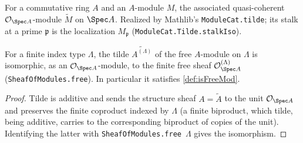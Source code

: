 \begin{definition}
  \label{def:tildeMod}
  \mathlibok
  For a commutative ring $A$ and an $A$-module $M$, the associated
  quasi-coherent $\mathcal{O}_{\Spec A}$-module $\widetilde M$ on $\Spec A$.
  Realized by Mathlib's \texttt{ModuleCat.tilde}; its stalk at a prime
  $\mathfrak p$ is the localization $M_{\mathfrak p}$
  (\texttt{ModuleCat.Tilde.stalkIso}).
\end{definition}

\begin{lemma}
  \label{lem:tilde_free}
  For a finite index type $\Lambda$, the tilde $\widetilde{A^{(\Lambda)}}$ of the
  free $A$-module on $\Lambda$ is isomorphic, as an
  $\mathcal{O}_{\Spec A}$-module, to the finite free sheaf
  $\mathcal{O}_{\Spec A}^{(\Lambda)}$ (\texttt{SheafOfModules.free}). In
  particular it satisfies \cref{def:isFreeMod}.
  \begin{proof}
    Tilde is additive and sends the structure sheaf $A = \widetilde A$ to the
    unit $\mathcal{O}_{\Spec A}$ and preserves the finite coproduct indexed by
    $\Lambda$ (a finite biproduct, which tilde, being additive, carries to the
    corresponding biproduct of copies of the unit). Identifying the latter with
    \texttt{SheafOfModules.free}~$\Lambda$ gives the isomorphism.
  \end{proof}
\end{lemma}

